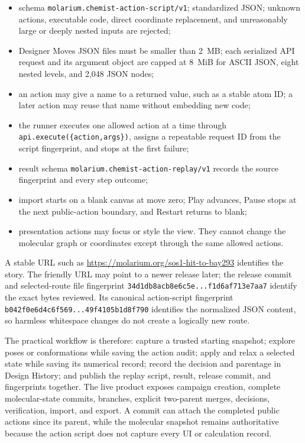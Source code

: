 \begin{itemize}
  \item schema \texttt{molarium.chemist-action-script/v1}; standardized JSON;
    unknown actions, executable code, direct coordinate replacement, and
    unreasonably large or deeply nested inputs are rejected;
  \item Designer Moves JSON files must be smaller than 2~MB; each serialized
    API request and its argument object are capped at 8~MiB for ASCII JSON,
    eight nested levels, and 2,048 JSON nodes;
  \item an action may give a name to a returned value, such as a stable atom ID;
    a later action may reuse that name without embedding new code;
  \item the runner executes one allowed action at a time through
    \texttt{api.execute(\{action,args\})}, assigns a repeatable request ID from
    the script fingerprint, and stops at the first failure;
  \item result schema \texttt{molarium.chemist-action-replay/v1} records the
    source fingerprint and every step outcome;
  \item import starts on a blank canvas at move zero; Play advances, Pause stops
  at the next public-action boundary, and Restart returns to blank;
  \item presentation actions may focus or style the view. They cannot change the
    molecular graph or coordinates except through the same allowed actions.
\end{itemize}

A stable URL such as \url{https://molarium.org/sos1-hit-to-bay293} identifies the
story. The friendly URL may point to a newer release later; the release commit
and selected-route file fingerprint
\texttt{34d1db8acb8e6c5e...f1d6af713e7aa7} identify the exact bytes reviewed. Its
canonical action-script fingerprint
\texttt{b042f0e6d4c6f569...49f4105b1d8f790} identifies the normalized JSON content, so
harmless whitespace changes do not create a logically new route.

The practical workflow is therefore: capture a trusted starting snapshot;
explore poses or conformations while saving the action audit; apply and relax a
selected state while saving its numerical record; record the decision and
parentage in Design History; and publish the replay script, result, release
commit, and fingerprints together. The live product exposes campaign creation,
complete molecular-state commits, branches, explicit two-parent merges,
decisions, verification, import, and export. A commit can attach the completed
public actions since its parent, while the molecular snapshot remains
authoritative because the action script does not capture every UI or calculation
record.

